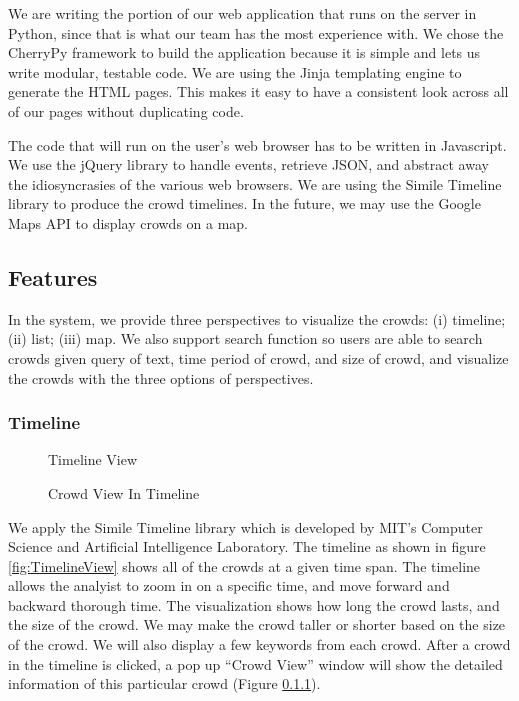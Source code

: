 \documentclass{sig-alternate}
\begin{document}
We are writing the portion of our web application that runs on the server in
Python, since that is what our team has the most experience with. We chose the
CherryPy framework to build the application because it is simple and lets us
write modular, testable code. We are using the Jinja templating engine to
generate the HTML pages. This makes it easy to have a consistent look across
all of our pages without duplicating code.

The code that will run on the user's web browser has to be written in
Javascript. We use the jQuery library to handle events, retrieve JSON, and
abstract away the idiosyncrasies of the various web browsers. We are using the
Simile Timeline library \cite{simile} to produce the crowd timelines. In the 
future, we may use the Google Maps API to display crowds on a map.

\subsection{Features}

In the system, we provide three perspectives to visualize the crowds: (i) timeline;
(ii) list; (iii) map. We also support search function so users are able to search 
crowds given query of text, time period of crowd, and size of crowd, and visualize
the crowds with the three options of perspectives.

\subsubsection{Timeline}

\begin{figure}
\centering
{}
\caption{Timeline View}
\label{fig:Timeline View}
\end{figure}

\begin{figure}
\centering
{}
\caption{Crowd View In Timeline}
\label{fig:CrowdViewInTimeline}
\end{figure}

We apply the Simile Timeline library which is developed by MIT's Computer
Science and Artificial Intelligence Laboratory. The timeline as shown in figure \ref{fig:TimelineView} shows all of the
crowds at a given time span.  The timeline allows the analyist to zoom in on a
specific time, and move forward and backward thorough time.  The visualization
shows how long the crowd lasts, and the size of the crowd. We may make the
crowd taller or shorter based on the size of the crowd.  We will also display a
few keywords from each crowd. After a crowd in the timeline is clicked, a pop up ``Crowd View'' window will show the detailed information of this particular crowd (Figure \ref{}).
\end{document}
